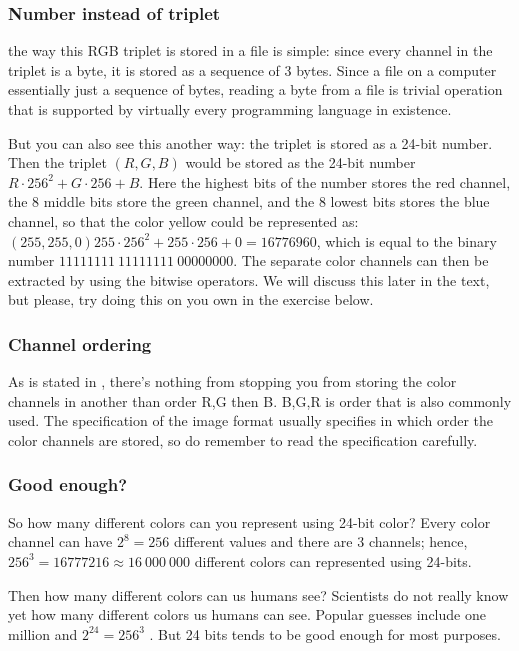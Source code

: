 \subsubsection{Number instead of triplet}

the way this RGB triplet is stored in a file is simple: since every
channel in the triplet is a byte, it is stored as a sequence of 3
bytes. Since a file on a computer essentially just a sequence of
bytes, reading a byte from a file is trivial operation that is
supported by virtually every programming language in existence.

But you can also see this another way: the triplet is stored as a
24-bit number. Then the triplet $(R,G,B)$ would be stored as the
24-bit number $R \cdot 256^2 + G \cdot 256 + B$. Here the highest bits
of the number stores the red channel, the 8 middle bits store the
green channel, and the 8 lowest bits stores the blue channel, so that
the color yellow could be represented as: $(255,255,0) 255 \cdot 256^2
+ 255 \cdot 256 + 0 = 16776960$, which is equal to the binary number
$11111111\ 11111111\ 00000000$. The separate color channels can then
be extracted by using the bitwise operators. We will discuss this
later in the text, but please, try doing this on you own in the
exercise below.

\subsubsection{Channel ordering}

As is stated in \cite{murray1996encyclopedia}, there's nothing from
stopping you from storing the color channels in another than order R,G then
B. B,G,R is order that is also commonly used. The specification of the
image format usually specifies in which order the color channels are
stored, so do remember to read the specification carefully.

\subsubsection{Good enough?}

So how many different colors can you represent using 24-bit color?
Every color channel can have $2^8 = 256$ different values and there
are $3$ channels; hence, $256^3 = 16777216 \approx 16\ 000\ 000$ different colors
can represented using 24-bits.

Then how many different colors can us humans see? Scientists do not
really know yet how many different colors us humans can see. Popular
guesses include one million \cite{roth:_tetrachromat} and $2^{24} =
256^3$ \cite{murray1996encyclopedia}. But 24 bits tends to be good
enough for most purposes.

